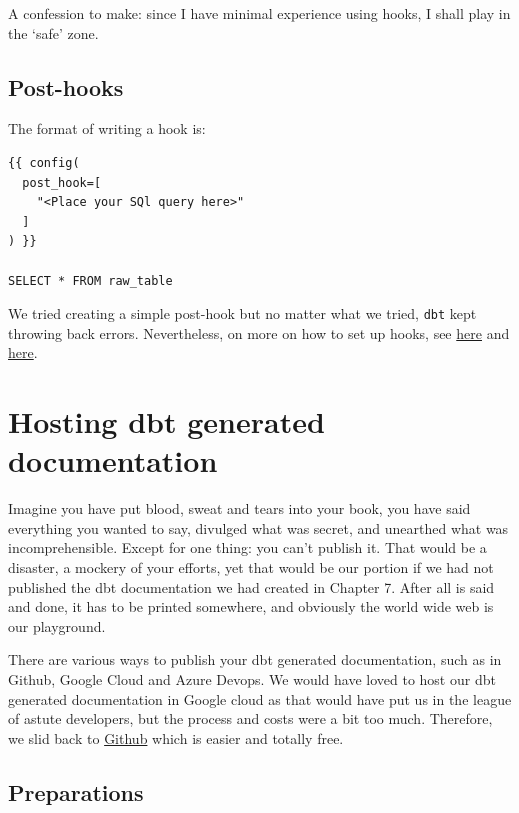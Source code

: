 \documentclass[
]{book}
\begin{document}
A confession to make: since I have minimal experience using hooks, I shall play in the `safe' zone.

\hypertarget{post-hooks}{%
\section{Post-hooks}\label{post-hooks}}

The format of writing a hook is:

\begin{verbatim}
{{ config(
  post_hook=[
    "<Place your SQl query here>"
  ]
) }}

SELECT * FROM raw_table
\end{verbatim}

We tried creating a simple post-hook but no matter what we tried, \texttt{dbt} kept throwing back errors. Nevertheless, on more on how to set up hooks, see \href{https://docs.getdbt.com/docs/build/hooks-operations}{here} and \href{https://www.y42.com/docs/dbt-models/hooks}{here}.

\hypertarget{hosting-dbt-generated-documentation}{%
\chapter{Hosting dbt generated documentation}\label{hosting-dbt-generated-documentation}}

Imagine you have put blood, sweat and tears into your book, you have said everything you wanted to say, divulged what was secret, and unearthed what was incomprehensible. Except for one thing: you can't publish it. That would be a disaster, a mockery of your efforts, yet that would be our portion if we had not published the dbt documentation we had created in Chapter 7. After all is said and done, it has to be printed somewhere, and obviously the world wide web is our playground.

There are various ways to publish your dbt generated documentation, such as in Github, Google Cloud and Azure Devops. We would have loved to host our dbt generated documentation in Google cloud as that would have put us in the league of astute developers, but the process and costs were a bit too much. Therefore, we slid back to \href{https://medium.com/dbt-local-taiwan/host-dbt-documentation-site-with-github-pages-in-5-minutes-7b80e8b62feb}{Github} which is easier and totally free.

\hypertarget{preparations}{%
\section{Preparations}\label{preparations}}
\end{document}
